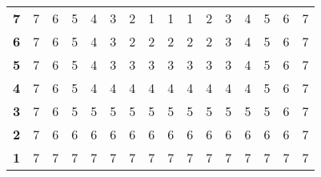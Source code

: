 \documentclass{article}
\begin{document}
\begin{table}[H]
\begin{tabular}{llllllllllllllll}
\multicolumn{1}{l|}{\textbf{7}}  & 7          & 6          & 5          & 4          & 3          & 2          & 1          & 1          & 1          & 2          & 3          & 4          & 5          & 6          & 7          \\
\multicolumn{1}{l|}{\textbf{6}}  & 7          & 6          & 5          & 4          & 3          & 2          & 2          & 2          & 2          & 2          & 3          & 4          & 5          & 6          & 7          \\
\multicolumn{1}{l|}{\textbf{5}}  & 7          & 6          & 5          & 4          & 3          & 3          & 3          & 3          & 3          & 3          & 3          & 4          & 5          & 6          & 7          \\
\multicolumn{1}{l|}{\textbf{4}}  & 7          & 6          & 5          & 4          & 4          & 4          & 4          & 4          & 4          & 4          & 4          & 4          & 5          & 6          & 7          \\
\multicolumn{1}{l|}{\textbf{3}}  & 7          & 6          & 5          & 5          & 5          & 5          & 5          & 5          & 5          & 5          & 5          & 5          & 5          & 6          & 7          \\
\multicolumn{1}{l|}{\textbf{2}}  & 7          & 6          & 6          & 6          & 6          & 6          & 6          & 6          & 6          & 6          & 6          & 6          & 6          & 6          & 7          \\
\multicolumn{1}{l|}{\textbf{1}}  & 7          & 7          & 7          & 7          & 7          & 7          & 7          & 7          & 7          & 7          & 7          & 7          & 7          & 7          & 7         
\end{tabular}
\end{table}
\end{document}
